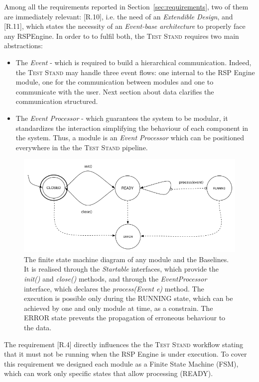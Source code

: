 Among all the requirements reported in Section~\ref{sec:requirements}, two of them are immediately relevant: [R.10], i.e. the need of an \textit{Extendible Design}, and [R.11], which states the necessity of an \textit{Event-base architecture} to properly face any RSPEngine. In order to to fulfil both, the \textsc{Test Stand} requires two main abstractions:
\begin{itemize}
\item The \textit{Event} - which is required to build a hierarchical communication. Indeed, the \textsc{Test Stand} may handle three event flows: one internal to the RSP Engine module, one for the communication between modules and one to communicate with the user. Next section about data clarifies the communication structured. 
\item The \textit{Event Processor} -  which guarantees the system to be modular, it standardizes the interaction simplifying the behaviour of each component in the system. Thus, a module is an \textit{Event Processor} which can be positioned everywhere in the the \textsc{Test Stand} pipeline.
\end{itemize}

\begin{figure}[h!tb]
  \centering
	\includegraphics[width=\linewidth]{images/fsm-schema}
	\caption[\textit{EventProcessor} States Diagram]{The finite state machine diagram of any \name module and the Baselines. It is realised through the \textit{Startable} interfaces, which provide the \textit{init()} and \textit{close() }methods, and through the \textit{EventProcessor} interface, which declares the \textit{process(Event e)} method. The execution is possible only during the RUNNING state, which can be achieved by one and only module at time, as a constrain. The ERROR state prevents the propagation of erroneous behaviour to the data.}
  	\label{fig:module-fsm}
\end{figure}

\noindent The requirement [R.4] directly influences the  the \textsc{Test Stand} workflow stating that it must not be running when the RSP Engine is under execution. To cover this requirement we designed each module as a Finite State Machine (FSM), which can work only specific states that allow processing (READY). 

